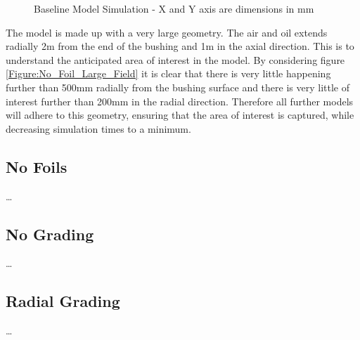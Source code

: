 \begin{figure}[!htb]
{	\label{Figure:No_Foil_Large_Mesh}
  }
\caption{Baseline Model Simulation - X and Y axis are dimensions in mm}
  \label{Figure:No_Foil_Large}
\end{figure}

The model is made up with a very large geometry. 
The air and oil extends radially 2m from the end of the bushing and 1m in the axial direction.
This is to understand the anticipated area of interest in the model.
By considering figure \ref{Figure:No_Foil_Large_Field} it is clear that there is very little happening further than 500mm radially from the bushing surface and there is very little of interest further than 200mm in the radial direction.
Therefore all further models will adhere to this geometry, ensuring that the area of interest is captured, while decreasing simulation times to a minimum.

\subsection{No Foils}
\dots

\subsection{No Grading}
\dots

\subsection{Radial Grading}
\dots


